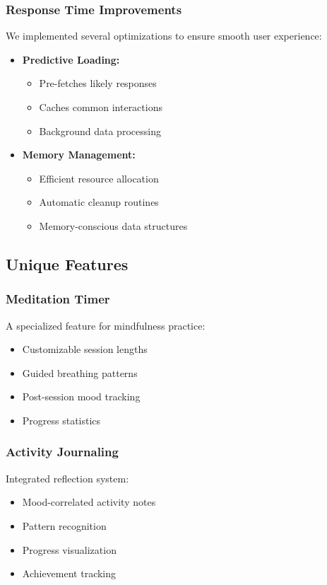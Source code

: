 \documentclass[12pt]{article}
\begin{document}
\subsubsection{Response Time Improvements}
We implemented several optimizations to ensure smooth user experience:
\begin{itemize}
    \item \textbf{Predictive Loading:}
    \begin{itemize}
        \item Pre-fetches likely responses
        \item Caches common interactions
        \item Background data processing
    \end{itemize}
    
    \item \textbf{Memory Management:}
    \begin{itemize}
        \item Efficient resource allocation
        \item Automatic cleanup routines
        \item Memory-conscious data structures
    \end{itemize}
\end{itemize}

\subsection{Unique Features}

\subsubsection{Meditation Timer}
A specialized feature for mindfulness practice:
\begin{itemize}
    \item Customizable session lengths
    \item Guided breathing patterns
    \item Post-session mood tracking
    \item Progress statistics
\end{itemize}

\subsubsection{Activity Journaling}
Integrated reflection system:
\begin{itemize}
    \item Mood-correlated activity notes
    \item Pattern recognition
    \item Progress visualization
    \item Achievement tracking
\end{itemize}
\end{document}
